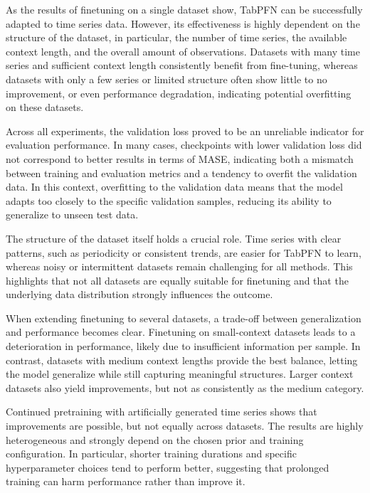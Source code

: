 As the results of finetuning on a single dataset show, TabPFN can be successfully adapted to time series data. However, its effectiveness is highly dependent on the structure of the dataset, in particular, the number of time series, the available context length, and the overall amount of observations.
Datasets with many time series and sufficient context length consistently benefit from fine-tuning, whereas datasets with only a few series or limited structure often show little to no improvement, or even performance degradation, indicating potential overfitting on these datasets.

Across all experiments, the validation loss proved to be an unreliable indicator for evaluation performance.
In many cases, checkpoints with lower validation loss did not correspond to better results in terms of MASE, indicating both a mismatch between training and evaluation metrics and a tendency to overfit the validation data.
In this context, overfitting to the validation data means that the model adapts too closely to the specific validation samples, reducing its ability to generalize to unseen test data.

The structure of the dataset itself holds a crucial role.
Time series with clear patterns, such as periodicity or consistent trends, are easier for TabPFN to learn, whereas noisy or intermittent datasets remain challenging for all methods.
This highlights that not all datasets are equally suitable for finetuning and that the underlying data distribution strongly influences the outcome.

When extending finetuning to several datasets, a trade-off between generalization and performance becomes clear.
Finetuning on small-context datasets leads to a deterioration in performance, likely due to insufficient information per sample.
In contrast, datasets with medium context lengths provide the best balance, letting the model generalize while still capturing meaningful structures.
Larger context datasets also yield improvements, but not as consistently as the medium category.

Continued pretraining with artificially generated time series shows that improvements are possible, but not equally across datasets.
The results are highly heterogeneous and strongly depend on the chosen prior and training configuration.
In particular, shorter training durations and specific hyperparameter choices tend to perform better, suggesting that prolonged training can harm performance rather than improve it.

